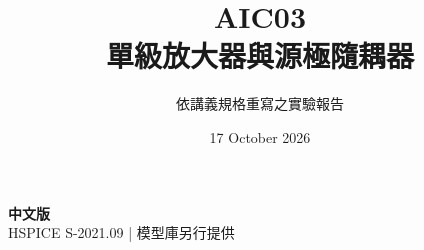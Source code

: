 \documentclass[11pt,a4paper]{article}
\title{\color{accent}AIC03\\[4pt]單級放大器與源極隨耦器}
\author{依講義規格重寫之實驗報告}
\date{17 October 2026}
\begin{document}
\maketitle
\begin{center}\small\textbf{中文版}\\
HSPICE S-2021.09 \quad | \quad 模型庫另行提供
\end{center}


\end{document}
